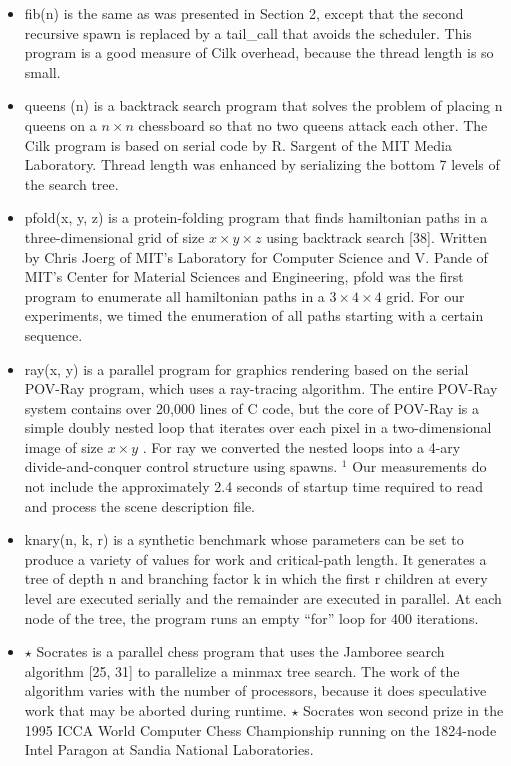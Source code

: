 \documentclass[
]{article}
\providecommand{\tightlist}{%
  \setlength{\itemsep}{0pt}\setlength{\parskip}{0pt}}
\begin{document}
\begin{itemize}
\tightlist
\item
  fib(n) is the same as was presented in Section 2, except that the
  second recursive spawn is replaced by a tail\_call that avoids the
  scheduler. This program is a good measure of Cilk overhead, because
  the thread length is so small.\\
\item
  queens (n) is a backtrack search program that solves the problem of
  placing n queens on a \(n \times n\) chessboard so that no two queens
  attack each other. The Cilk program is based on serial code by R.
  Sargent of the MIT Media Laboratory. Thread length was enhanced by
  serializing the bottom 7 levels of the search tree.\\
\item
  pfold(x, y, z) is a protein-folding program that finds hamiltonian
  paths in a three-dimensional grid of size \(x \times y \times z\)
  using backtrack search {[}38{]}. Written by Chris Joerg of MIT's
  Laboratory for Computer Science and V. Pande of MIT's Center for
  Material Sciences and Engineering, pfold was the first program to
  enumerate all hamiltonian paths in a \(3 \times 4 \times 4\) grid. For
  our experiments, we timed the enumeration of all paths starting with a
  certain sequence.\\
\item
  ray(x, y) is a parallel program for graphics rendering based on the
  serial POV-Ray program, which uses a ray-tracing algorithm. The entire
  POV-Ray system contains over 20,000 lines of C code, but the core of
  POV-Ray is a simple doubly nested loop that iterates over each pixel
  in a two-dimensional image of size \(x \times y\) . For ray we
  converted the nested loops into a 4-ary divide-and-conquer control
  structure using spawns. \(^{1}\) Our measurements do not include the
  approximately 2.4 seconds of startup time required to read and process
  the scene description file.\\
\item
  knary(n, k, r) is a synthetic benchmark whose parameters can be set to
  produce a variety of values for work and critical-path length. It
  generates a tree of depth n and branching factor k in which the first
  r children at every level are executed serially and the remainder are
  executed in parallel. At each node of the tree, the program runs an
  empty ``for'' loop for 400 iterations.\\
\item
  \(\star\) Socrates is a parallel chess program that uses the Jamboree
  search algorithm {[}25, 31{]} to parallelize a minmax tree search. The
  work of the algorithm varies with the number of processors, because it
  does speculative work that may be aborted during runtime. \(\star\)
  Socrates won second prize in the 1995 ICCA World Computer Chess
  Championship running on the 1824-node Intel Paragon at Sandia National
  Laboratories.
\end{itemize}
\end{document}
